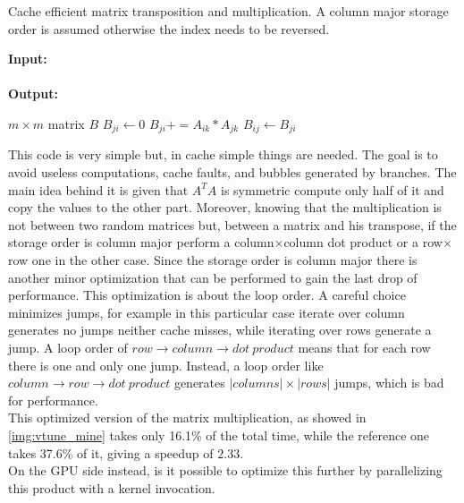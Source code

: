\begin{algorithm}[h]
  \begin{flushleft}
    \caption{Cache efficient matrix transposition and multiplication. A column major storage order is assumed otherwise the index needs to be reversed.}
    \label{alg:transpose_multiply}
    \textbf{Input:} \\
    \hspace*{\algorithmicindent} \\
    \textbf{Output:} \\
    \hspace*{\algorithmicindent} 
  \end{flushleft}
  \begin{algorithmic}[1]
    \State $m \times m$ matrix $B$
         
        \State $B_{ji} \gets 0$
        \State $B_{ji}+=A_{ik}*A_{jk}$
        \EndFor
        \State $B_{ij} \gets B_{ji}$ 
        \EndFor
        \EndFor
        \EndFunction
      \end{algorithmic}
    \end{algorithm}
This code is very simple but, in cache simple things are needed. The goal is to avoid useless computations, cache faults, and bubbles generated by branches. The main idea behind it is given that $A^TA$ is symmetric compute only half of it and copy the values to the other part. Moreover, knowing that the multiplication is not between two random matrices but, between a matrix and his transpose, if the storage order is column major perform a column$\times$column dot product or a row$\times$row one in the other case. Since the storage order is column major there is another minor optimization that can be performed to gain the last drop of performance. This optimization is about the loop order. A careful choice minimizes jumps, for example in this particular case iterate over column generates no jumps neither cache misses, while iterating over rows generate a jump. A loop order of $row \rightarrow column \rightarrow dot\ product$ means that for each row there is one and only one jump. Instead, a loop order like $column \rightarrow row \rightarrow dot\ product$ generates $|columns| \times |rows|$ jumps, which is bad for performance. \\
This optimized version of the matrix multiplication, as showed in \ref{img:vtune_mine} takes only 16.1\% of the total time, while the reference one takes 37.6\% of it, giving a speedup of $2.33$.\\
On the GPU side instead, is it possible to optimize this further by parallelizing this product with a kernel invocation. \\
